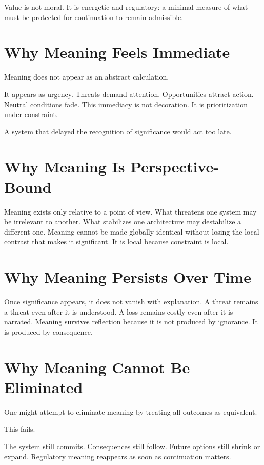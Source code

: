 \documentclass[11pt,twoside,openright]{book}
\begin{document}
Value is not moral. It is energetic and regulatory: a minimal measure of what must be protected for continuation to remain admissible.

\section*{Why Meaning Feels Immediate}

Meaning does not appear as an abstract calculation.

It appears as urgency. Threats demand attention. Opportunities attract action. Neutral conditions fade. This immediacy is not decoration. It is prioritization under constraint.

A system that delayed the recognition of significance would act too late.

\section*{Why Meaning Is Perspective-Bound}

Meaning exists only relative to a point of view. What threatens one system may be irrelevant to another. What stabilizes one architecture may destabilize a different one. Meaning cannot be made globally identical without losing the local contrast that makes it significant. It is local because constraint is local.

\section*{Why Meaning Persists Over Time}

Once significance appears, it does not vanish with explanation. A threat remains a threat even after it is understood. A loss remains costly even after it is narrated. Meaning survives reflection because it is not produced by ignorance. It is produced by consequence.

\section*{Why Meaning Cannot Be Eliminated}

One might attempt to eliminate meaning by treating all outcomes as equivalent.

This fails.

The system still commits. Consequences still follow. Future options still shrink or expand. Regulatory meaning reappears as soon as continuation matters.
\end{document}
